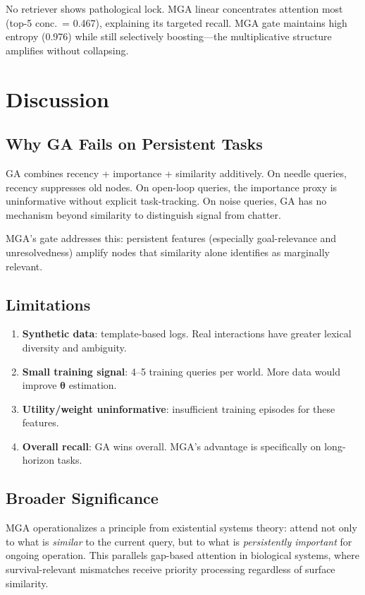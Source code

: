 \documentclass{article}
\begin{document}
No retriever shows pathological lock. MGA linear concentrates attention most (top-5 conc.\ = 0.467), explaining its targeted recall. MGA gate maintains high entropy (0.976) while still selectively boosting---the multiplicative structure amplifies without collapsing.

\section{Discussion}

\subsection{Why GA Fails on Persistent Tasks}

GA combines recency + importance + similarity additively. On needle queries, recency suppresses old nodes. On open-loop queries, the importance proxy is uninformative without explicit task-tracking. On noise queries, GA has no mechanism beyond similarity to distinguish signal from chatter.

MGA's gate addresses this: persistent features (especially goal-relevance and unresolvedness) amplify nodes that similarity alone identifies as marginally relevant.

\subsection{Limitations}

\begin{enumerate}[leftmargin=2em,itemsep=2pt]
\item \textbf{Synthetic data}: template-based logs. Real interactions have greater lexical diversity and ambiguity.
\item \textbf{Small training signal}: 4--5 training queries per world. More data would improve $\boldsymbol{\theta}$ estimation.
\item \textbf{Utility/weight uninformative}: insufficient training episodes for these features.
\item \textbf{Overall recall}: GA wins overall. MGA's advantage is specifically on long-horizon tasks.
\end{enumerate}

\subsection{Broader Significance}

MGA operationalizes a principle from existential systems theory: attend not only to what is \emph{similar} to the current query, but to what is \emph{persistently important} for ongoing operation. This parallels gap-based attention in biological systems, where survival-relevant mismatches receive priority processing regardless of surface similarity.
\end{document}
